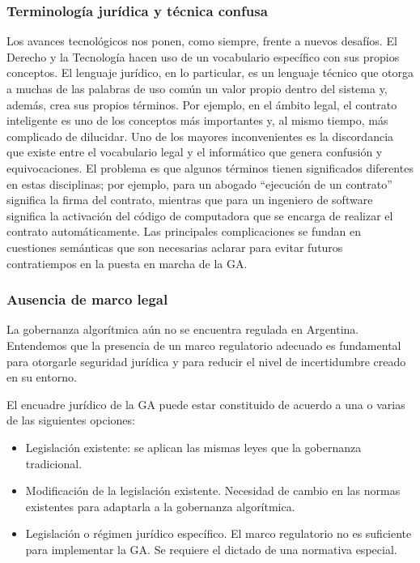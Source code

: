\documentclass[12pt]{report} %
\begin{document}
\subsubsection{Terminología jurídica y técnica confusa}

Los avances tecnológicos nos ponen, como siempre, frente a nuevos desafíos. El Derecho y la Tecnología hacen uso de un vocabulario específico con sus propios conceptos. El lenguaje jurídico, en lo particular, es un lenguaje técnico que otorga a muchas de las palabras de uso común un valor propio dentro del sistema y, además, crea sus propios términos. Por ejemplo, en el ámbito legal, el contrato inteligente es uno de los conceptos más importantes y, al mismo tiempo, más complicado de dilucidar. Uno de los mayores inconvenientes es la discordancia que existe entre el vocabulario legal y el informático que genera confusión y equivocaciones. El problema es que algunos términos tienen significados diferentes en estas disciplinas; por ejemplo, para un abogado “ejecución de un contrato” significa la firma del contrato, mientras que para un ingeniero de software significa la activación del código de computadora que se encarga de realizar el contrato automáticamente. Las principales complicaciones se fundan en cuestiones semánticas que son necesarias  aclarar para evitar futuros contratiempos en la puesta en marcha de la GA.

\subsubsection{Ausencia de marco legal }

La gobernanza algorítmica aún no se encuentra regulada en Argentina. Entendemos que la presencia de un marco regulatorio adecuado es fundamental para otorgarle seguridad jurídica y para reducir el nivel de incertidumbre creado en su entorno. 

El encuadre jurídico de la GA puede estar constituido de acuerdo a una o varias de las siguientes opciones:

\begin{itemize}
    \item Legislación existente: se aplican las mismas leyes que la gobernanza tradicional.
    \item Modificación de la legislación existente. Necesidad de cambio en las normas existentes para adaptarla a la gobernanza algorítmica.
    \item Legislación o régimen jurídico específico. El marco regulatorio no es suficiente para implementar la GA. Se requiere el dictado de una normativa especial. 
\end{itemize}
\end{document}
